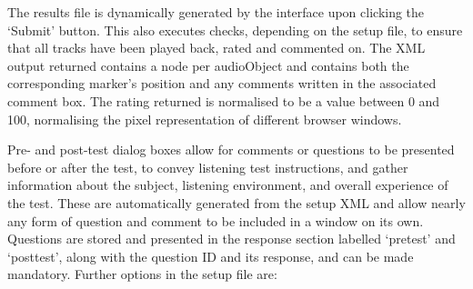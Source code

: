 \documentclass{article}
\begin{document}
The results file is dynamically generated by the interface upon clicking the `Submit' button. This also executes checks, depending on the setup file, to ensure that all tracks have been played back, rated and commented on. The XML output returned contains a node per audioObject and contains both the corresponding marker's position and any comments written in the associated comment box. The rating returned is normalised to be a value between 0 and 100, normalising the pixel representation of different browser windows. 

Pre- and post-test dialog boxes allow for comments or questions to be presented before or after the test, to convey listening test instructions, and gather information about the subject, listening environment, and overall experience of the test. These are automatically generated from the setup XML and allow nearly any form of question and comment to be included in a window on its own. Questions are stored and presented in the response section labelled `pretest' and `posttest', along with the question ID and its response, and can be made mandatory. 
Further options in the setup file are: 
\end{document}
